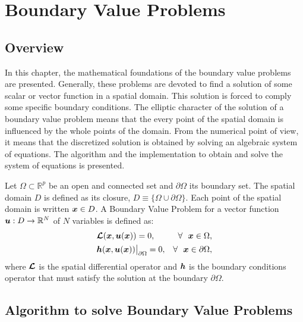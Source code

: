      
\chapter{Boundary Value Problems}\label{Dev:BVP}
\section{Overview}
       
In this chapter,  the mathematical foundations of the boundary value problems are presented. Generally, these problems are devoted to find a solution of some scalar or vector function in a spatial domain. This solution is forced to comply  some  specific boundary conditions.  
The elliptic character of the solution of a boundary value problem means that the every point of the spatial domain is influenced by the whole points of the domain. From the numerical point of view, it means that the discretized solution is obtained by solving an algebraic
system of equations. The algorithm and the implementation to obtain and solve the system of equations is presented. 

    
Let  $\Omega \subset \mathbb{ R}^p$ be an open and connected set and $\partial \Omega$ its boundary set. The spatial domain $D$ is defined as its closure, $D \equiv \{\Omega \cup \partial \Omega\}$. Each point of the spatial domain is written  $\boldsymbol{x} \in D $.
A Boundary Value Problem for a vector function $ \boldsymbol{u}: D \rightarrow \mathbb{R}^{N}$ of $N$ variables is defined as:
       \begin{align}
           &\boldsymbol{\mathcal{L}} (\boldsymbol{x},\boldsymbol{u}(\boldsymbol{x})) = 0, & \forall \ \ \boldsymbol{x} \in  \Omega, \\
           &\boldsymbol{h} (\boldsymbol{x},\boldsymbol{u}(\boldsymbol{x}))\big\rvert_{\partial \Omega}=0 ,  & \forall \ \ \boldsymbol{x} \in \partial \Omega,
       \end{align}
where $\boldsymbol{\mathcal{L}}$ is the spatial differential operator and $\boldsymbol{h}$ is the boundary conditions operator that must satisfy the solution at the boundary $\partial \Omega$.    
    
       
       
\newpage 
\section{Algorithm to solve Boundary Value Problems}

